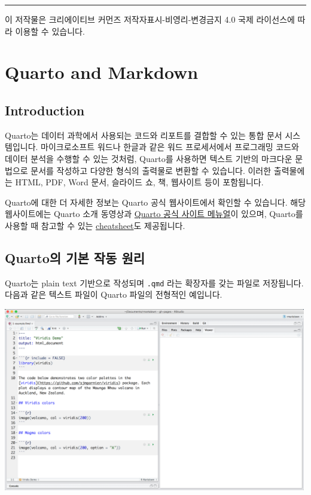 \documentclass[
  a4paper,
]{book}
\begin{document}
\begin{center}\rule{0.5\linewidth}{0.5pt}\end{center}

이 저작물은 크리에이티브 커먼즈 저작자표시-비영리-변경금지 4.0 국제
라이선스에 따라 이용할 수 있습니다.


\hypertarget{quarto-and-markdown}{%
\chapter{Quarto and Markdown}\label{quarto-and-markdown}}

\hypertarget{introduction-1}{%
\section{Introduction}\label{introduction-1}}

Quarto는 데이터 과학에서 사용되는 코드와 리포트를 결합할 수 있는 통합
문서 시스템입니다. 마이크로소프트 워드나 한글과 같은 워드 프로세서에서
프로그래밍 코드와 데이터 분석을 수행할 수 있는 것처럼, Quarto를 사용하면
텍스트 기반의 마크다운 문법으로 문서를 작성하고 다양한 형식의 출력물로
변환할 수 있습니다. 이러한 출력물에는 HTML, PDF, Word 문서, 슬라이드 쇼,
책, 웹사이트 등이 포함됩니다.

Quarto에 대한 더 자세한 정보는 Quarto 공식 웹사이트에서 확인할 수
있습니다. 해당 웹사이트에는 Quarto 소개 동영상과
\href{https://quarto.org/docs/}{Quarto 공식 사이트 메뉴얼}이 있으며,
Quarto를 사용할 때 참고할 수 있는
\href{https://quarto.org/docs/cheatsheets/quarto}{cheatsheet}도
제공됩니다.

\hypertarget{quartouxc758-uxae30uxbcf8-uxc791uxb3d9-uxc6d0uxb9ac}{%
\section{Quarto의 기본 작동
원리}\label{quartouxc758-uxae30uxbcf8-uxc791uxb3d9-uxc6d0uxb9ac}}

Quarto는 plain text 기반으로 작성되며 \texttt{.qmd} 라는 확장자를 갖는
파일로 저장됩니다. 다음과 같은 텍스트 파일이 Quarto 파일의 전형적인
예입니다.

\includegraphics[width=5.20833in,height=\textheight]{images/rmarkdown/how-1-file.png}
\end{document}
